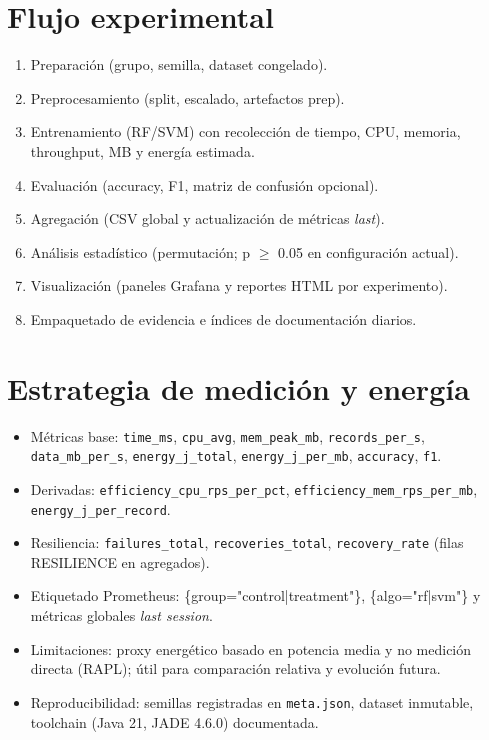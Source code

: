 \documentclass[12pt,twoside]{report}
\begin{document}
\section{Flujo experimental}
\begin{enumerate}
  \item Preparación (grupo, semilla, dataset congelado).
  \item Preprocesamiento (split, escalado, artefactos prep).\label{flujo:prep}
  \item Entrenamiento (RF/SVM) con recolección de tiempo, CPU, memoria, throughput, MB y energía estimada.
  \item Evaluación (accuracy, F1, matriz de confusión opcional).
  \item Agregación (CSV global y actualización de métricas \emph{last}).
  \item Análisis estadístico (permutación; p \(\ge\) 0.05 en configuración actual).
  \item Visualización (paneles Grafana y reportes HTML por experimento).
  \item Empaquetado de evidencia e índices de documentación diarios.
\end{enumerate}

\section{Estrategia de medición y energía}
\begin{itemize}
  \item Métricas base: \texttt{time\_ms}, \texttt{cpu\_avg}, \texttt{mem\_peak\_mb}, \texttt{records\_per\_s}, \texttt{data\_mb\_per\_s}, \texttt{energy\_j\_total}, \texttt{energy\_j\_per\_mb}, \texttt{accuracy}, \texttt{f1}.
  \item Derivadas: \texttt{efficiency\_cpu\_rps\_per\_pct}, \texttt{efficiency\_mem\_rps\_per\_mb}, \texttt{energy\_j\_per\_record}.
  \item Resiliencia: \texttt{failures\_total}, \texttt{recoveries\_total}, \texttt{recovery\_rate} (filas RESILIENCE en agregados).
  \item Etiquetado Prometheus: \{group="control|treatment"\}, \{algo="rf|svm"\} y métricas globales \emph{last session}.
  \item Limitaciones: proxy energético basado en potencia media y no medición directa (RAPL); útil para comparación relativa y evolución futura.
  \item Reproducibilidad: semillas registradas en \texttt{meta.json}, dataset inmutable, toolchain (Java 21, JADE 4.6.0) documentada.
\end{itemize}
\end{document}
